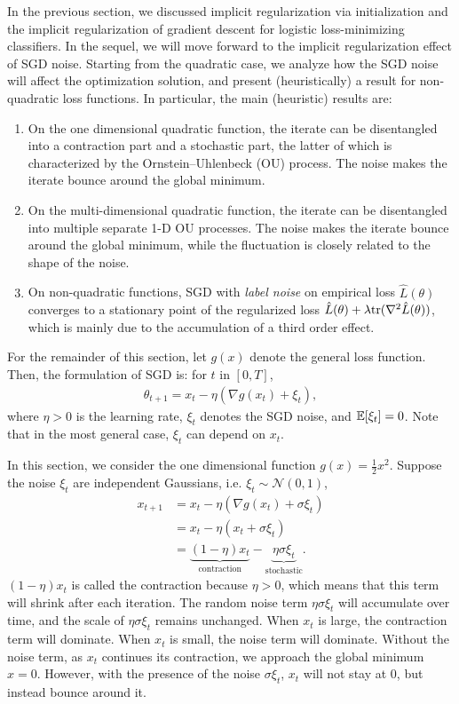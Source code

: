 In the previous section, we discussed implicit regularization via initialization and the implicit regularization of gradient descent for logistic loss-minimizing classifiers. 
In the sequel, we will move forward to the implicit regularization effect of SGD noise. Starting from the quadratic case, we analyze how the SGD noise will affect the optimization solution, and present (heuristically) a result for non-quadratic loss functions. In particular, the main (heuristic) results are:
\begin{enumerate}
\item On the one dimensional quadratic function, the iterate can be disentangled into a contraction part and a stochastic part, the latter of which is characterized by the Ornstein–Uhlenbeck (OU) process. The noise makes the iterate bounce around the global minimum.
\item On the multi-dimensional quadratic function, the iterate can be disentangled into multiple separate 1-D OU processes. The noise makes the iterate bounce around the global minimum, while the fluctuation is closely related to the shape of the noise.
\item On non-quadratic functions, SGD with \textit{label noise} on empirical loss $\hat{L}(\theta)$ converges to a stationary point of the regularized loss $\hat{L}(\theta) + \lambda \textup{tr}(\nabla^2\hat{L}(\theta))$, which is mainly due to the accumulation of a third order effect.
\end{enumerate}
 

For the remainder of this section, let $g(x)$ denote the general loss function. Then, the formulation of SGD is: for $t$ in $[0,T]$,
\begin{align}
\theta_{t+1} = x_{t} - \eta(\nabla g(x_{t}) + \xi_t),
\end{align} 
where $\eta > 0$ is the learning rate, $\xi_t$ denotes the SGD noise, and $\operatorname*{\mathbb{E}}[\xi_t] = 0$. Note that in the most general case, $\xi_t$ can depend on $x_t$.
	
In this section, we consider the one dimensional function $g(x) = \frac{1}{2} x^2$. Suppose the noise $\xi_t$ are independent Gaussians, i.e. $\xi_t \sim \mathcal{N}(0,1)$,
\begin{align}
x_{t+1} &= x_t - \eta(\nabla g(x_{t}) + \sigma\xi_t)\\
&= x_t - \eta(x_{t} + \sigma\xi_t)\\
&= \underbrace{(1 - \eta)x_t}_{\text{contraction}} - \underbrace{\eta\sigma\xi_t}_{\text{stochastic}}\label{lec17:eqn:ou}.
\end{align}
$(1 - \eta)x_t$ is called the contraction because $\eta > 0$, which means that this term will shrink after each iteration. The random noise term $\eta\sigma\xi_t$ will accumulate over time, and the scale of $\eta\sigma\xi_t$ remains unchanged. When $x_t$ is large, the contraction term will dominate. When $x_t$ is small, the noise term will dominate. Without the noise term, as $x_t$ continues its contraction, we approach the global minimum $x = 0$. However, with the presence of the noise $\sigma\xi_t$, $x_t$ will not stay at $0$, but instead bounce around it. 

